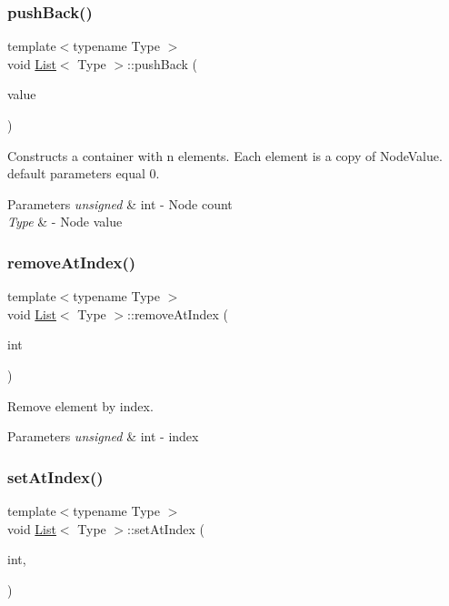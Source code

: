 \subsubsection{\texorpdfstring{push\+Back()}{pushBack()}}
{\footnotesize\ttfamily template$<$typename Type $>$ \\
void \hyperlink{classList}{List}$<$ Type $>$\+::push\+Back (\begin{DoxyParamCaption}\item[{Type}]{value }\end{DoxyParamCaption})}



Constructs a container with n elements. Each element is a copy of Node\+Value. default parameters equal 0. 


\begin{DoxyParams}{Parameters}
{\em unsigned} & int -\/ Node count \\
\hline
{\em Type} & -\/ Node value \\
\hline
\end{DoxyParams}
\mbox{\label{classList_a07496984175b07818abe40573209c7d1}} 
\subsubsection{\texorpdfstring{remove\+At\+Index()}{removeAtIndex()}}
{\footnotesize\ttfamily template$<$typename Type $>$ \\
void \hyperlink{classList}{List}$<$ Type $>$\+::remove\+At\+Index (\begin{DoxyParamCaption}\item[{unsigned}]{int }\end{DoxyParamCaption})}



Remove element by index. 


\begin{DoxyParams}{Parameters}
{\em unsigned} & int -\/ index \\
\hline
\end{DoxyParams}
\mbox{\label{classList_a8a1748e3792f7c0ee8ff1a89f823b159}} 
\subsubsection{\texorpdfstring{set\+At\+Index()}{setAtIndex()}}
{\footnotesize\ttfamily template$<$typename Type $>$ \\
void \hyperlink{classList}{List}$<$ Type $>$\+::set\+At\+Index (\begin{DoxyParamCaption}\item[{unsigned}]{int,  }\item[{Type}]{ }\end{DoxyParamCaption})}



